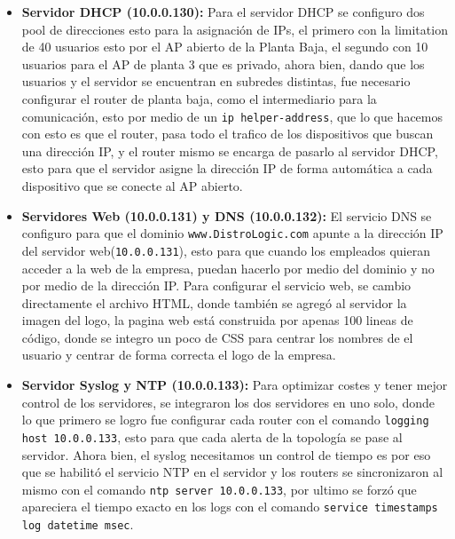 \documentclass[letterpaper,11pt]{article}
\begin{document}
    \begin{itemize}
        \item \textbf{Servidor DHCP (10.0.0.130):} Para el servidor DHCP se configuro dos pool
        de direcciones esto para la asignación de IPs, el primero con la limitation de 40 usuarios 
        esto por el AP abierto de la Planta Baja, el segundo con 10 usuarios para el AP de planta 3 que es privado, 
        ahora bien, dando que los usuarios y el servidor se encuentran en subredes  distintas, fue necesario configurar el router de planta baja, como el intermediario para la comunicación, 
        esto por medio de un \texttt{ip helper-address}, que lo que hacemos con esto es que el router, pasa todo el trafico de los dispositivos que buscan una dirección IP, y el router mismo se encarga de pasarlo al servidor DHCP,
        esto para que el servidor asigne la dirección IP de forma automática a cada dispositivo que se conecte al AP abierto.
        
        \item \textbf{Servidores Web (10.0.0.131) y DNS (10.0.0.132):} El servicio DNS se configuro para que el dominio \texttt{www.DistroLogic.com} apunte a la dirección IP del servidor web(\texttt{10.0.0.131}), esto para que cuando los empleados quieran acceder a la web de la empresa, puedan hacerlo por medio del dominio y no por medio de la dirección IP. Para configurar el servicio web, se cambio directamente el archivo HTML, donde también se agregó al servidor la imagen del logo, la pagina web está construida por apenas 100 lineas de código, donde se integro un poco de CSS para centrar los nombres de el usuario y centrar de forma correcta el logo de la empresa.
        
        \item \textbf{Servidor Syslog y NTP (10.0.0.133):} Para optimizar costes y tener mejor control de los servidores, se integraron los dos servidores en uno solo, donde lo que primero se logro fue 
        configurar cada router con el comando \texttt{logging host 10.0.0.133}, 
        esto para que cada alerta de la topología se pase al servidor. 
        Ahora bien, el syslog necesitamos un control de tiempo es por eso que se habilitó el servicio NTP 
        en el servidor y los routers se sincronizaron al mismo con el comando \texttt{ntp server 10.0.0.133}, por ultimo
        se forzó que apareciera el tiempo exacto en los logs con el comando \texttt{service timestamps log datetime msec}.
    \end{itemize}
\end{document}
